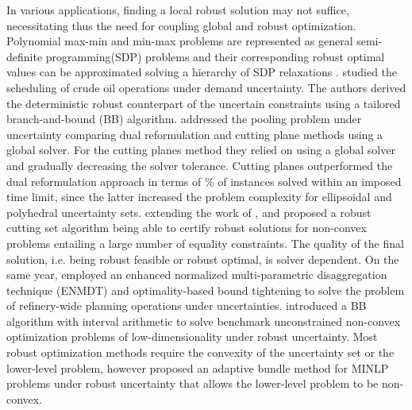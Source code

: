 \documentclass[sn-mathphys-num]{sn-jnl}
\begin{document}
In various applications, finding a local robust solution may not suffice, necessitating thus the need for coupling global and robust optimization. Polynomial max-min and min-max problems are represented as general semi-definite programming(SDP) problems and their corresponding robust optimal values can be approximated solving a hierarchy of SDP relaxations \citep{Lasserre2006, Lasserre2011}. \citet{Li2011_gro} studied the scheduling of crude oil operations under demand uncertainty. The authors derived the deterministic robust counterpart of the uncertain constraints using a tailored branch-and-bound (BB) algorithm. \citet{Wiebe2019} addressed the pooling problem under uncertainty comparing dual reformulation and cutting plane methods using a global solver. For the cutting planes method they relied on using a global solver and gradually decreasing the solver tolerance. Cutting planes outperformed the dual reformulation approach in terms of \% of instances solved within an imposed time limit, since the latter increased the problem complexity for ellipsoidal and polyhedral uncertainty sets.  \citet{Isenberg2021} extending the work of \citet{Mutapcic2009}, and proposed a robust cutting set algorithm being able to certify robust solutions for non-convex problems entailing a large number of equality constraints. The quality of the final solution, i.e. being robust feasible or robust optimal, is solver dependent. On the same year, \citet{Zhang2021} employed an enhanced normalized multi-parametric disaggregation technique (ENMDT) and optimality-based bound tightening to solve the problem of refinery-wide  planning operations under uncertainties. \citet{Carrizosa2021} introduced a BB algorithm with interval arithmetic to solve benchmark unconstrained non-convex optimization problems of low-dimensionality under robust uncertainty. Most robust optimization methods require the convexity of the uncertainty set or the lower-level problem, however \citet{Kuchlbauer2022} proposed an adaptive bundle method for MINLP problems under robust uncertainty that allows the lower-level problem to be non-convex. 
\end{document}
